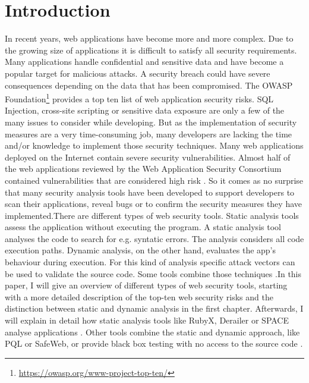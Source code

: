 \section{Introduction}
\label{section:Introduction}
In recent years, web applications have become more and more complex. Due to the growing size of applications it is difficult to satisfy all security requirements. Many applications handle confidential and sensitive data and have become a popular target for malicious attacks. A security breach could have severe consequences depending on the data that has been compromised.\newline
The OWASP Foundation\footnote{ \url{https://owasp.org/www-project-top-ten/}} provides a top ten list of web application security risks. SQL Injection, cross-site scripting or sensitive data exposure are only a few of the many issues to consider while developing. But as the implementation of security measures are a very time-consuming job, many developers are lacking the time and/or knowledge to implement those security techniques. Many web applications deployed on the Internet contain severe security vulnerabilities. Almost half of the web applications reviewed by the Web Application Security Consortium contained vulnerabilities that are considered high risk \autocite[2]{Li2014}.
So it comes as no surprise that many security analysis tools have been developed to support developers to scan their applications, reveal bugs or to confirm the security measures they have implemented.\newline There are different types of web security tools. Static analysis tools assess the application without executing the program. A static analysis tool analyses the code to search for e.g. syntatic errors. The analysis considers all code execution paths. Dynamic analysis, on the other hand, evaluates the app's behaviour during execution. For this kind of analysis specific attack vectors can be used to validate the source code. Some tools combine those techniques \autocite[]{Lam2008,Hosek2011}.\newline In this paper, I will give an overview of different types of web security tools, starting with a more detailed description of the top-ten web security risks and the distinction between static and dynamic analysis in the first chapter. Afterwards, I will explain in detail how static analysis tools like RubyX, Derailer or SPACE analyse applications \autocite[]{Chaudhuri2010, Near2014, Near2016}.  Other tools combine the static and dynamic approach, like PQL or SafeWeb, or provide black box testing with no access to the source code \autocite[]{Lam2008,Hosek2011,Araujo2018}.

